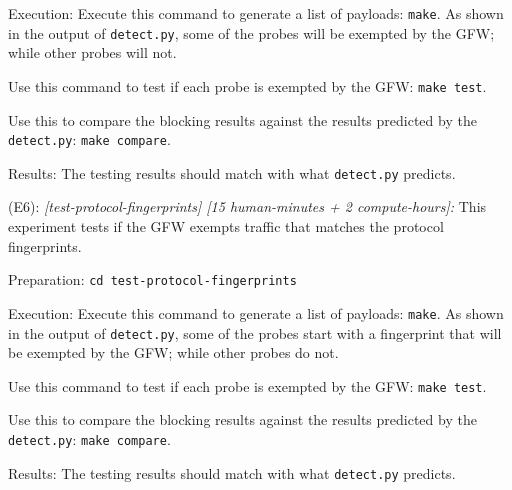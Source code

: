 \begin{compactdesc}
\begin{asparadesc}
        \item[Execution:]
        Execute this command to generate a list of payloads: \texttt{make}. 
        As shown in the output of \texttt{detect.py},
        some of the probes will be exempted by the GFW; 
        while other probes will not.

        Use this command to test if each probe is exempted by the GFW:
        \texttt{make test}.

        Use this to compare the blocking results against the results predicted by the \texttt{detect.py}:
        \texttt{make compare}.

        \item[Results:] The testing results should match with what \texttt{detect.py} predicts.
    \end{asparadesc}
    
    \item[(E6):] \textit{[test-protocol-fingerprints] [15 human-minutes + 2 compute-hours]:}
    This experiment tests if the GFW exempts traffic that matches the protocol fingerprints.
    \begin{asparadesc}
        \item[Preparation:] \texttt{cd test-protocol-fingerprints}

        \item[Execution:]
        Execute this command to generate a list of payloads: \texttt{make}. 
        As shown in the output of \texttt{detect.py},
        some of the probes start with
        a fingerprint that will be exempted by the GFW; 
        while other probes do not.

        Use this command to test if each probe is exempted by the GFW:
        \texttt{make test}.

        Use this to compare the blocking results against the results predicted by the \texttt{detect.py}:
        \texttt{make compare}.

        \item[Results:] The testing results should match with what \texttt{detect.py} predicts.
    \end{asparadesc}
    

\end{compactdesc}



